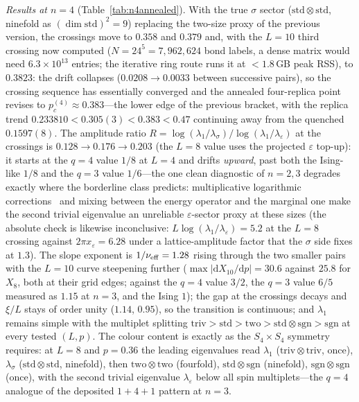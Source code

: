 \documentclass[aps,prx,reprint,superscriptaddress,nobibnotes,longbibliography]{revtex4-2}
\theoremstyle{remark}
\begin{document}
\emph{Results at $n=4$} (Table~\ref{tab:n4annealed}).  With the true $\sigma$ sector ($\mathrm{std}\otimes\mathrm{std}$, ninefold as $(\dim\mathrm{std})^2=9$) replacing the two-size proxy of the previous version, the crossings move to $0.358$ and $0.379$ and, with the $L=10$ third crossing now computed ($N=24^5=7{,}962{,}624$ bond labels, a dense matrix would need $6.3\times10^{13}$ entries; the iterative ring route runs it at $<1.8$\,GB peak RSS), to $0.3823$: the drift collapses ($0.0208\to0.0033$ between successive pairs), so the crossing sequence has essentially converged and the annealed four-replica point revises to $p_c^{(4)}\approx0.383$---the lower edge of the previous bracket, with the replica trend $0.233810<0.305(3)<0.383<0.47$ continuing away from the quenched $0.1597(8)$.  The amplitude ratio $R=\log(\lambda_1/\lambda_\sigma)/\log(\lambda_1/\lambda_\varepsilon)$ at the crossings is $0.128\to0.176\to0.203$ (the $L=8$ value uses the projected $\varepsilon$ top-up): it starts at the $q=4$ value $1/8$ at $L=4$ and drifts \emph{upward}, past both the Ising-like $1/8$ and the $q=3$ value $1/6$---the one clean diagnostic of $n=2,3$ degrades exactly where the borderline class predicts: multiplicative logarithmic corrections~\cite{Cardy1986} and mixing between the energy operator and the marginal one make the second trivial eigenvalue an unreliable $\varepsilon$-sector proxy at these sizes (the absolute check is likewise inconclusive: $L\log(\lambda_1/\lambda_\varepsilon)=5.2$ at the $L=8$ crossing against $2\pi x_\varepsilon=6.28$ under a lattice-amplitude factor that the $\sigma$ side fixes at $1.3$).  The slope exponent is $1/\nu_{\rm eff}=1.28$ rising through the two smaller pairs with the $L=10$ curve steepening further ($\max|\mathrm{d}X_{10}/\mathrm{d}p|=30.6$ against $25.8$ for $X_8$, both at their grid edges; against the $q=4$ value $3/2$, the $q=3$ value $6/5$ measured as $1.15$ at $n=3$, and the Ising $1$); the gap at the crossings decays and $\xi/L$ stays of order unity ($1.14$, $0.95$), so the transition is continuous; and $\lambda_1$ remains simple with the multiplet splitting $\mathrm{triv}>\mathrm{std}>\mathrm{two}>\mathrm{std}\otimes\mathrm{sgn}>\mathrm{sgn}$ at every tested $(L,p)$.  The colour content is exactly as the $S_4\times S_4$ symmetry requires: at $L=8$ and $p=0.36$ the leading eigenvalues read $\lambda_1$ ($\mathrm{triv}\otimes\mathrm{triv}$, once), $\lambda_\sigma$ ($\mathrm{std}\otimes\mathrm{std}$, ninefold), then $\mathrm{two}\otimes\mathrm{two}$ (fourfold), $\mathrm{std}\otimes\mathrm{sgn}$ (ninefold), $\mathrm{sgn}\otimes\mathrm{sgn}$ (once), with the second trivial eigenvalue $\lambda_\varepsilon$ below all spin multiplets---the $q=4$ analogue of the deposited $1+4+1$ pattern at $n=3$.
\end{document}
